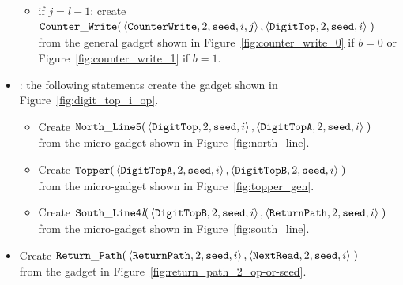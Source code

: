 \begin{itemize}
\begin{itemize}
        \item if $j = l-1$: create
        $\begin{aligned}[t]
            {\tt Counter\_Write}(&\left\langle {\tt CounterWrite}, 2, {\tt seed}, i, j \right\rangle, \left\langle {\tt DigitTop}, 2, {\tt seed}, i \right\rangle \;)
        \end{aligned}$\\from the general gadget shown in Figure~\ref{fig:counter_write_0} if $b = 0$ or Figure~\ref{fig:counter_write_1} if $b = 1$.
    \end{itemize}


    \item {\dtop}: the following statements create the gadget shown in Figure~\ref{fig:digit_top_i_op}.
    \begin{itemize}
        \item Create
        $\begin{aligned}[t]
            {\tt North\_Line5}(& \left \langle {\tt DigitTop},  2, {\tt seed}, i \right\rangle,
                                 \left \langle {\tt DigitTopA}, 2, {\tt seed}, i \right\rangle \;)
        \end{aligned}$\\ from the micro-gadget shown in Figure~\ref{fig:north_line}.

        \item Create
        $\begin{aligned}[t]
            {\tt Topper}(& \left \langle {\tt DigitTopA}, 2, {\tt seed}, i \right\rangle,
                           \left \langle {\tt DigitTopB}, 2, {\tt seed}, i \right\rangle \;)
        \end{aligned}$\\ from the micro-gadget shown in Figure~\ref{fig:topper_gen}.

        \item Create
        $\begin{aligned}[t]
            {\tt South\_Line4\textit{l}}(&\left\langle {\tt DigitTopB},  2, {\tt seed}, i \right\rangle,
                                          \left\langle {\tt ReturnPath}, 2, {\tt seed}, i \right\rangle \;)
        \end{aligned}$\\ from the micro-gadget shown in Figure~\ref{fig:south_line}.
    \end{itemize}


    \item Create
    $\begin{aligned}[t]
        {\tt Return\_Path}(&\left\langle {\tt ReturnPath}, 2, {\tt seed}, i \right\rangle,
                     \left\langle {\tt NextRead},   2, {\tt seed}, i \right\rangle \;)
    \end{aligned}$\\ from the gadget in Figure~\ref{fig:return_path_2_op-or-seed}.



\end{itemize}
